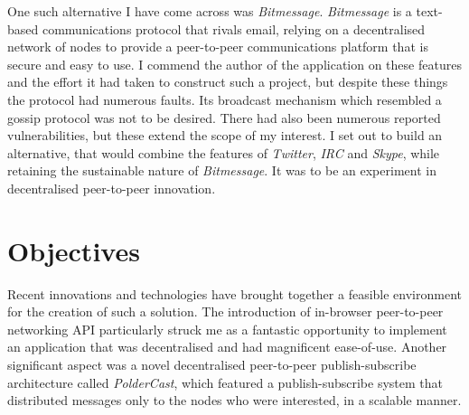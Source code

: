 \documentclass[10pt,a4paper,onecolumn]{article}
\begin{document}
One such alternative I have come across was \textit{Bitmessage}. \textit{Bitmessage} is a text-based communications protocol that rivals email, relying on a decentralised network of nodes to provide a peer-to-peer communications platform that is secure and easy to use. I commend the author of the application on these features and the effort it had taken to construct such a project, but despite these things the protocol had numerous faults. Its broadcast mechanism which resembled a gossip protocol was not to be desired. There had also been numerous reported vulnerabilities, but these extend the scope of my interest. I set out to build an alternative, that would combine the features of \textit{Twitter}, \textit{IRC} and \textit{Skype}, while retaining the sustainable nature of \textit{Bitmessage}. It was to be an experiment in decentralised peer-to-peer innovation.

\section{Objectives}
Recent innovations and technologies have brought together a feasible environment for the creation of such a solution. The introduction of in-browser peer-to-peer networking API particularly struck me as a fantastic opportunity to implement an application that was decentralised and had magnificent ease-of-use. Another significant aspect was a novel decentralised peer-to-peer publish-subscribe architecture called \textit{PolderCast}, which featured a publish-subscribe system that distributed messages only to the nodes who were interested, in a scalable manner.
\end{document}
